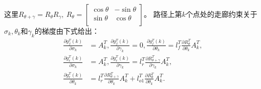 \documentclass[master,academic]{ysuthesis} %
\begin{document}
		这里$R_{\theta +\gamma}=R_{\theta}R_{\gamma},\ R_{\theta}=\left[ \begin{matrix}
			\cos\theta&		-\sin\theta\\
			\sin\theta&		\cos\theta\\
		\end{matrix} \right] $。
		路径上第$k$个点处的走廊约束关于$\sigma_k,\theta_k$和$\gamma_k$的梯度由下式给出：
		\begin{equation}
			\begin{aligned}
			\frac{\partial g_{f}^{T}(k)}{\partial \sigma _k}&=A_{k}^{T},\frac{\partial g_{f}^{T}(k)}{\partial \gamma _k}=0,\frac{\partial g_{f}^{T}(k)}{\partial \theta _k}=l_{f}^{T}\frac{\partial R_{\theta}^{T}}{\partial \theta _k}A_{k}^{T},\\
			\frac{\partial g_{r}^{T}(k)}{\partial \sigma _k}&=A_{k}^{T},\frac{\partial g_{r}^{T}(k)}{\partial \gamma _k}=l_{r}^{T}\frac{\partial R_{\theta +\gamma}^{T}}{\partial \gamma _k}A_{k}^{T},\\
			\frac{\partial g_{r}^{T}(k)}{\partial \theta _k}&=l_{r}^{T}\frac{\partial R_{\theta +\gamma}^{T}}{\partial \theta _k}A_{k}^{T}+l_{o1}^{T}\frac{\partial R_{\theta}^{T}}{\partial \theta _k}A_{k}^{T}.
			\end{aligned}
		\end{equation}
\end{document}
